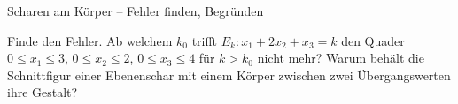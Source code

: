\begin{aufgabe}{Scharen am Körper – Fehler finden, Begründen}
\begin{teile}
\teil Finde den Fehler. Ab welchem $k_0$ trifft $E_k: x_1 + 2x_2 + x_3 = k$ den Quader $0 \le x_1 \le 3$, $0 \le x_2 \le 2$, $0 \le x_3 \le 4$ für $k > k_0$ nicht mehr? 
\teil Warum behält die Schnittfigur einer Ebenenschar mit einem Körper zwischen zwei Übergangswerten ihre Gestalt?
\end{teile}
\end{aufgabe}
